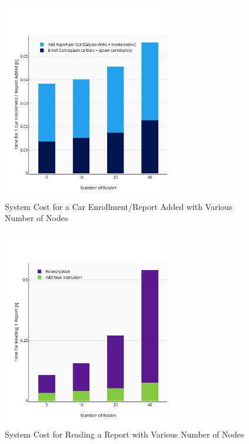 \begin{figure}[H]
    \centering
    \includegraphics[width=0.65\textwidth, heigth=0.65\textwidth]{Sim/System-Cost-Nodes-Enroll.png}
    \vspace{-20pt}
    \caption{System Cost for a Car Enrollment/Report Added with Various Number of Nodes}
    \label{System Cost Hosts Enroll}
\end{figure}
\vspace{-35pt}
\begin{figure}[H]
    \centering
    \includegraphics[width=0.65\textwidth, heigth=0.65\textwidth]{Sim/System-Cost-Nodes-Read.png}
    \vspace{-20pt}
    \caption{System Cost for Reading a Report with Various Number of Nodes}
    \label{System Cost Hosts Read}
\end{figure}


